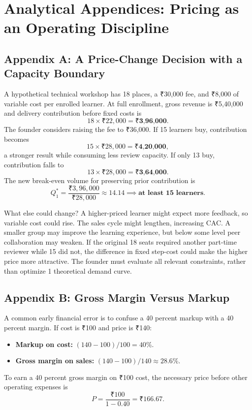 \section*{Analytical Appendices: Pricing as an Operating Discipline}

\subsection*{Appendix A: A Price-Change Decision with a Capacity Boundary}

A hypothetical technical workshop has 18 places, a ₹30,000 fee, and ₹8,000 of variable cost per enrolled learner. At full enrollment, gross revenue is ₹5,40,000 and delivery contribution before fixed costs is
\begin{equation}
18 \times ₹22,000 = \textbf{₹3,96,000}.
\end{equation}
The founder considers raising the fee to ₹36,000. If 15 learners buy, contribution becomes
\begin{equation}
15 \times ₹28,000 = \textbf{₹4,20,000},
\end{equation}
a stronger result while consuming less review capacity. If only 13 buy, contribution falls to
\begin{equation}
13 \times ₹28,000 = \textbf{₹3,64,000}.
\end{equation}
The new break-even volume for preserving prior contribution is
\begin{equation}
Q_1^* = \frac{₹3,96,000}{₹28,000} \approx 14.14 \implies \textbf{at least 15 learners}.
\end{equation}

What else could change? A higher-priced learner might expect more feedback, so variable cost could rise. The sales cycle might lengthen, increasing CAC. A smaller group may improve the learning experience, but below some level peer collaboration may weaken. If the original 18 seats required another part-time reviewer while 15 did not, the difference in fixed step-cost could make the higher price more attractive. The founder must evaluate all relevant constraints, rather than optimize 1 theoretical demand curve.

\subsection*{Appendix B: Gross Margin Versus Markup}

A common early financial error is to confuse a 40 percent markup with a 40 percent margin. If cost is ₹100 and price is ₹140:
\begin{itemize}
  \item \textbf{Markup on cost:} $(140 - 100)/100 = 40\%$.
  \item \textbf{Gross margin on sales:} $(140 - 100)/140 \approx 28.6\%$.
\end{itemize}
To earn a 40 percent gross margin on ₹100 cost, the necessary price before other operating expenses is
\begin{equation}
P = \frac{₹100}{1 - 0.40} = ₹166.67.
\end{equation}

